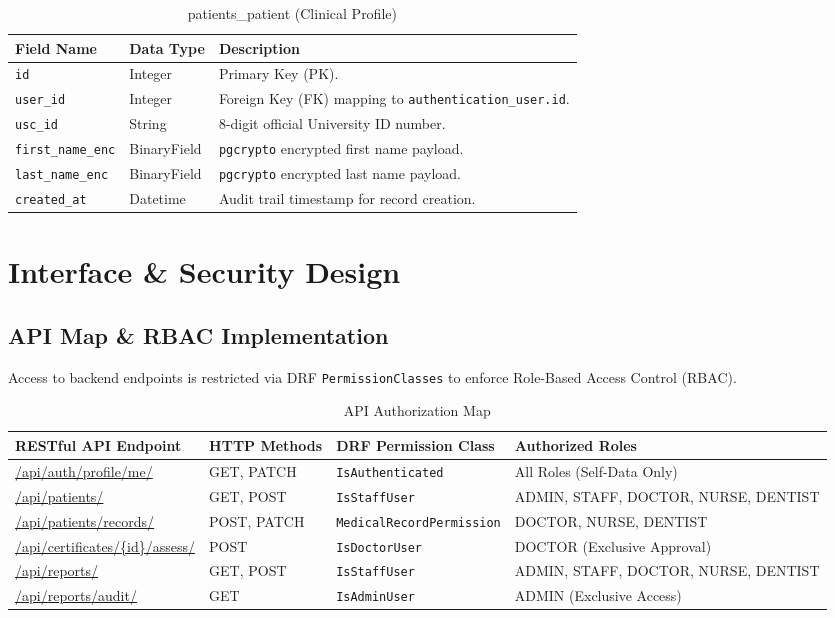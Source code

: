\begin{table}[htbp]
\centering
\caption{patients\_patient (Clinical Profile)}
\begin{tabular}{|l|l|p{7cm}|}
\hline
\textbf{Field Name} & \textbf{Data Type} & \textbf{Description} \\
\hline
\texttt{id} & Integer & Primary Key (PK). \\
\hline
\texttt{user\_id} & Integer & Foreign Key (FK) mapping to \texttt{authentication\_user.id}. \\
\hline
\texttt{usc\_id} & String & 8-digit official University ID number. \\
\hline
\texttt{first\_name\_enc} & BinaryField & \texttt{pgcrypto} encrypted first name payload. \\
\hline
\texttt{last\_name\_enc} & BinaryField & \texttt{pgcrypto} encrypted last name payload. \\
\hline
\texttt{created\_at} & Datetime & Audit trail timestamp for record creation. \\
\hline
\end{tabular}
\end{table}

\section{Interface \& Security Design}

\subsection{API Map \& RBAC Implementation}
Access to backend endpoints is restricted via DRF \texttt{PermissionClasses} to enforce Role-Based Access Control (RBAC).

\begin{table}[htbp]
\centering
\caption{API Authorization Map}
\begin{tabular}{|p{4.5cm}|p{2cm}|p{3.5cm}|p{3.5cm}|}
\hline
\textbf{RESTful API Endpoint} & \textbf{HTTP Methods} & \textbf{DRF Permission Class} & \textbf{Authorized Roles} \\
\hline
\url{/api/auth/profile/me/} & GET, PATCH & \texttt{IsAuthenticated} & All Roles (Self-Data Only) \\
\hline
\url{/api/patients/} & GET, POST & \texttt{IsStaffUser} & ADMIN, STAFF, DOCTOR, NURSE, DENTIST \\
\hline
\url{/api/patients/records/} & POST, PATCH & \texttt{MedicalRecordPermission} & DOCTOR, NURSE, DENTIST \\
\hline
\url{/api/certificates/{id}/assess/} & POST & \texttt{IsDoctorUser} & DOCTOR (Exclusive Approval) \\
\hline
\url{/api/reports/} & GET, POST & \texttt{IsStaffUser} & ADMIN, STAFF, DOCTOR, NURSE, DENTIST \\
\hline
\url{/api/reports/audit/} & GET & \texttt{IsAdminUser} & ADMIN (Exclusive Access) \\
\hline
\end{tabular}
\end{table}

